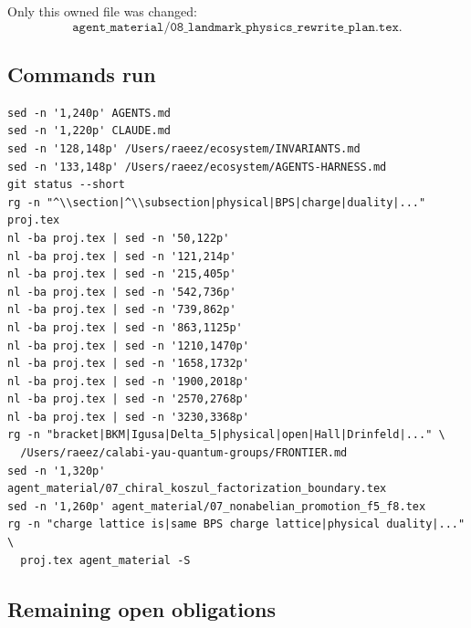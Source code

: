 Only this owned file was changed:
$$
\texttt{agent\_material/08\_landmark\_physics\_rewrite\_plan.tex}.
$$

\subsection{Commands run}

\begin{verbatim}
sed -n '1,240p' AGENTS.md
sed -n '1,220p' CLAUDE.md
sed -n '128,148p' /Users/raeez/ecosystem/INVARIANTS.md
sed -n '133,148p' /Users/raeez/ecosystem/AGENTS-HARNESS.md
git status --short
rg -n "^\\section|^\\subsection|physical|BPS|charge|duality|..." proj.tex
nl -ba proj.tex | sed -n '50,122p'
nl -ba proj.tex | sed -n '121,214p'
nl -ba proj.tex | sed -n '215,405p'
nl -ba proj.tex | sed -n '542,736p'
nl -ba proj.tex | sed -n '739,862p'
nl -ba proj.tex | sed -n '863,1125p'
nl -ba proj.tex | sed -n '1210,1470p'
nl -ba proj.tex | sed -n '1658,1732p'
nl -ba proj.tex | sed -n '1900,2018p'
nl -ba proj.tex | sed -n '2570,2768p'
nl -ba proj.tex | sed -n '3230,3368p'
rg -n "bracket|BKM|Igusa|Delta_5|physical|open|Hall|Drinfeld|..." \
  /Users/raeez/calabi-yau-quantum-groups/FRONTIER.md
sed -n '1,320p' agent_material/07_chiral_koszul_factorization_boundary.tex
sed -n '1,260p' agent_material/07_nonabelian_promotion_f5_f8.tex
rg -n "charge lattice is|same BPS charge lattice|physical duality|..." \
  proj.tex agent_material -S
\end{verbatim}

\subsection{Remaining open obligations}

